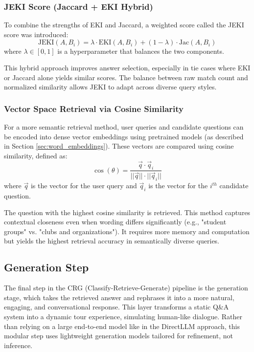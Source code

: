 \documentclass[conference]{IEEEtran}
\begin{document}
\subsubsection{JEKI Score (Jaccard + EKI Hybrid)}
To combine the strengths of EKI and Jaccard, a weighted score called the JEKI score was introduced:
\begin{equation}
    \text{JEKI}(A, B_i) = \lambda \cdot \text{EKI}(A, B_i) + (1 - \lambda) \cdot \text{Jac}(A, B_i)
\end{equation}
where $\lambda \in [0, 1]$ is a hyperparameter that balances the two components.

This hybrid approach improves answer selection, especially in tie cases where EKI or Jaccard alone yields similar scores. 
The balance between raw match count and normalized similarity allows JEKI to adapt across diverse query styles.

\subsubsection{Vector Space Retrieval via Cosine Similarity}
For a more semantic retrieval method, user queries and candidate questions can be encoded into dense vector embeddings using pretrained models (as described in Section \ref{sec:word_embeddings}). 
These vectors are compared using cosine similarity, defined as:
\begin{equation}
    \cos(\theta) = \frac{ \vec{q} \cdot \vec{q}_i }{ ||\vec{q}|| \cdot ||\vec{q}_i|| }
\end{equation}
where $\vec{q}$ is the vector for the user query and $\vec{q}_i$ is the vector for the $i^{th}$ candidate question.

The question with the highest cosine similarity is retrieved. 
This method captures contextual closeness even when wording differs significantly (e.g., "student groups" vs. "clubs and organizations"). 
It requires more memory and computation but yields the highest retrieval accuracy in semantically diverse queries.

\subsection{Generation Step}
The final step in the CRG (Classify-Retrieve-Generate) pipeline is the generation stage, which takes the retrieved answer and rephrases it into a more natural, engaging, and conversational response. 
This layer transforms a static Q\&A system into a dynamic tour experience, simulating human-like dialogue. 
Rather than relying on a large end-to-end model like in the DirectLLM approach, this modular step uses lightweight generation models tailored for refinement, not inference.
\end{document}
